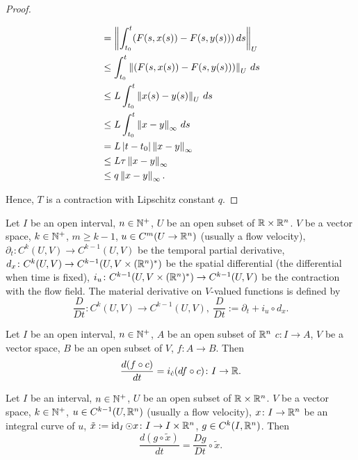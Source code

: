 \begin{proof}
\begin{itemize}
\begin{equation}
\begin{split}
          & = \left\lVert\int_{t_0}^t (F(s, x(s)) - F(s, y(s)))\, d s\right\rVert_U \\
          & \leq \int_{t_0}^t \left\lVert(F(s, x(s)) - F(s, y(s)))\right\rVert_U\, d s \\
          & \leq L \int_{t_0}^t \left\lVert x(s) - y(s)\right\rVert_U\, d s \\
          & \leq L \int_{t_0}^t \left\lVert x - y\right\rVert_\infty\, d s \\
          & = L \left\lvert t - t_0\right\rvert \left\lVert x - y\right\rVert_\infty \\
          & \leq L \tau \left\lVert x - y\right\rVert_\infty \\
          & \leq q \left\lVert x - y\right\rVert_\infty.
        \end{split}
      \end{equation}
  \end{itemize}
  Hence, $T$ is a contraction with Lipschitz constant $q$.
\end{proof}
\begin{definition}
  Let
    $I$ be an open interval,
    $n \in \mathbb{N}^+$,
    $U$ be an open subset of $\mathbb{R} \times \mathbb{R}^n$.
    $V$ be a vector space,
    $k \in \mathbb{N}^+$,
    $m \geq k - 1$,
    $u \in C^m(U \to \mathbb{R}^n)$ (usually a flow velocity),
    $\partial_t \colon C^k(U, V) \to C^{k - 1}(U, V)$
      be the temporal partial derivative,
    $d_x \colon C^k(U, V) \to C^{k - 1}(U, V \times (\mathbb{R}^n)^*)$
      be the spatial differential (the differential when time is fixed),
    $i_u \colon C^{k - 1}(U, V \times (\mathbb{R}^n)^*) \to C^{k - 1}(U, V)$
      be the contraction with the flow field.
  The material derivative on $V$-valued functions is defined by
  \begin{equation}
    \frac{D}{D t} \colon C^k(U, V) \to C^{k - 1}(U, V),\
    \frac{D}{D t} := \partial_t + i_u \circ d_x.
  \end{equation}
\end{definition}
\begin{proposition}
  Let
    $I$ be an open interval,
    $n \in \mathbb{N}^+$,
    $A$ be an open subset of $\mathbb{R}^n$
    $c \colon I \to A$,
    $V$ be a vector space,
    $B$ be an open subset of $V$,
    $f \colon A \to B$.
  Then
  \begin{equation}
    \frac{d(f \circ c)}{d t} = i_{\dot{c}}(d f \circ c) \colon I \to \mathbb{R}.
  \end{equation}
\end{proposition}
\begin{proposition}
  Let
    $I$ be an interval,
    $n \in \mathbb{N}^+$,
    $U$ be an open subset of $\mathbb{R} \times \mathbb{R}^n$.
    $V$ be a vector space,
    $k \in \mathbb{N}^+$,
    $u \in C^{k - 1}(U, \mathbb{R}^n)$ (usually a flow velocity),
    $x \colon I \to \mathbb{R}^n$ be an integral curve of $u$,
    $\tilde{x} := \mathop{\rm id}\nolimits_I \odot x \colon I \to I \times \mathbb{R}^n$,
    $g \in C^k(I, \mathbb{R}^n)$.
  Then
  \begin{equation}
    \frac{d (g \circ \tilde{x})}{d t} = \frac{D g}{D t} \circ \tilde{x}.
  \end{equation}
\end{proposition}
